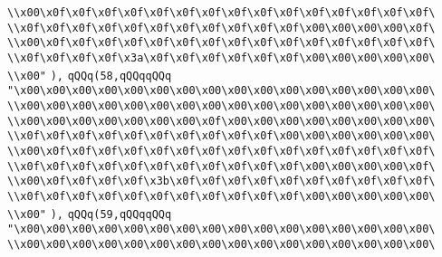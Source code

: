 \verb|\\x00\x0f\x0f\x0f\x0f\x0f\x0f\x0f\x0f\x0f\x0f\x0f\x0f\x0f\x0f\x0f\|\newline
\verb|\\x0f\x0f\x0f\x0f\x0f\x0f\x0f\x0f\x0f\x0f\x0f\x00\x00\x00\x00\x0f\|\newline
\verb|\\x00\x0f\x0f\x0f\x0f\x0f\x0f\x0f\x0f\x0f\x0f\x0f\x0f\x0f\x0f\x0f\|\newline
\verb|\\x0f\x0f\x0f\x0f\x3a\x0f\x0f\x0f\x0f\x0f\x0f\x00\x00\x00\x00\x00\|\newline
\verb|\\x00"|\newline
\verb|),|\newline
\verb|qQQq(58,qQQqqQQq|\newline
\verb|"\x00\x00\x00\x00\x00\x00\x00\x00\x00\x00\x00\x00\x00\x00\x00\x00\|\newline
\verb|\\x00\x00\x00\x00\x00\x00\x00\x00\x00\x00\x00\x00\x00\x00\x00\x00\|\newline
\verb|\\x00\x00\x00\x00\x00\x00\x00\x0f\x00\x00\x00\x00\x00\x00\x00\x00\|\newline
\verb|\\x0f\x0f\x0f\x0f\x0f\x0f\x0f\x0f\x0f\x0f\x00\x00\x00\x00\x00\x00\|\newline
\verb|\\x00\x0f\x0f\x0f\x0f\x0f\x0f\x0f\x0f\x0f\x0f\x0f\x0f\x0f\x0f\x0f\|\newline
\verb|\\x0f\x0f\x0f\x0f\x0f\x0f\x0f\x0f\x0f\x0f\x0f\x00\x00\x00\x00\x0f\|\newline
\verb|\\x00\x0f\x0f\x0f\x0f\x3b\x0f\x0f\x0f\x0f\x0f\x0f\x0f\x0f\x0f\x0f\|\newline
\verb|\\x0f\x0f\x0f\x0f\x0f\x0f\x0f\x0f\x0f\x0f\x0f\x00\x00\x00\x00\x00\|\newline
\verb|\\x00"|\newline
\verb|),|\newline
\verb|qQQq(59,qQQqqQQq|\newline
\verb|"\x00\x00\x00\x00\x00\x00\x00\x00\x00\x00\x00\x00\x00\x00\x00\x00\|\newline
\verb|\\x00\x00\x00\x00\x00\x00\x00\x00\x00\x00\x00\x00\x00\x00\x00\x00\|\newline
